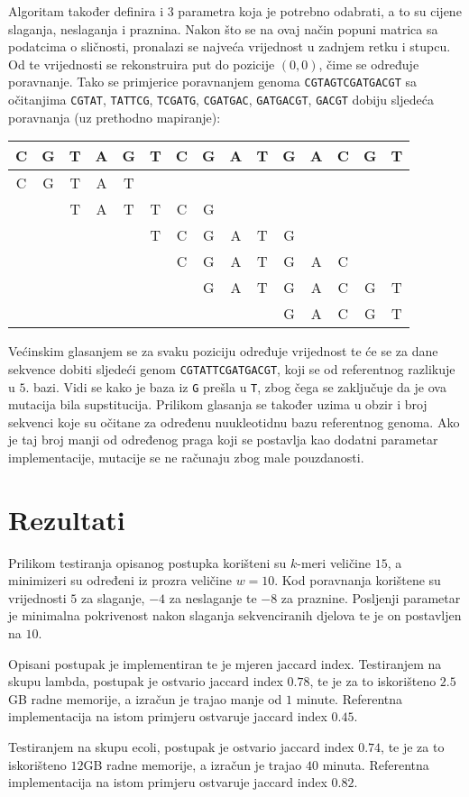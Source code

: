 \documentclass[times, utf8, seminar, numeric]{fer}
\begin{document}
Algoritam također definira i $3$ parametra koja je potrebno odabrati, a to su cijene slaganja, neslaganja i praznina.
Nakon što se na ovaj način popuni matrica sa podatcima o sličnosti, pronalazi se najveća vrijednost u zadnjem retku i stupcu.
Od te vrijednosti se rekonstruira put do pozicije $(0,0)$, čime se određuje poravnanje.
Tako se primjerice poravnanjem genoma \texttt{CGTAGTCGATGACGT} sa očitanjima 
\texttt{CGTAT}, 
\texttt{TATTCG},
\texttt{TCGATG},
\texttt{CGATGAC},
\texttt{GATGACGT}, 
\texttt{GACGT}
dobiju sljedeća poravnanja (uz prethodno mapiranje):

\begin{tabular}{ccccccccccccccc }
    C&G&T&A&G&T&C&G&A&T&G&A&C&G&T\\ \hline
    C&G&T&A&T&&&&&&&&&&\\
     & &T&A&T&T&C&G& & & & & & &\\
     & & & & &T&C&G&A&T&G& & & &\\
     & & & & & &C&G&A&T&G&A&C& &\\
     & & & & & & &G&A&T&G&A&C&G&T\\
     & & & & & & & & & &G&A&C&G&T\\
\end{tabular}

Većinskim glasanjem se za svaku poziciju određuje vrijednost te će se za dane sekvence dobiti sljedeći genom 
\texttt{CGTATTCGATGACGT}, koji se od referentnog razlikuje u $5.$ bazi. 
Vidi se kako je baza iz \texttt{G} prešla u \texttt{T}, zbog čega se zaključuje da je ova mutacija bila supstitucija.
Prilikom glasanja se također uzima u obzir i broj sekvenci koje su očitane za određenu nuukleotidnu bazu referentnog genoma.
Ako je taj broj manji od određenog praga koji se postavlja kao dodatni parametar implementacije, mutacije se ne računaju zbog male pouzdanosti.

\chapter{Rezultati}
Prilikom testiranja opisanog postupka korišteni su $k$-meri veličine $15$, a minimizeri su određeni iz prozra veličine $w=10$.
Kod poravnanja korištene su vrijednosti $5$ za slaganje, $-4$ za neslaganje te $-8$ za praznine.
Posljenji parametar je minimalna pokrivenost nakon slaganja sekvenciranih djelova te je on postavljen na $10$.

Opisani postupak je implementiran te je mjeren jaccard index.
Testiranjem na skupu lambda, postupak je ostvario jaccard index $0.78$,
te je za to iskorišteno $2.5$GB radne memorije, a izračun je trajao manje od $1$ minute.
Referentna implementacija na istom primjeru ostvaruje jaccard index $0.45$. 

Testiranjem na skupu ecoli, postupak je ostvario jaccard index $0.74$,
te je za to iskorišteno $12$GB radne memorije, a izračun je trajao $40$ minuta.
Referentna implementacija na istom primjeru ostvaruje jaccard index $0.82$.



\end{document}
